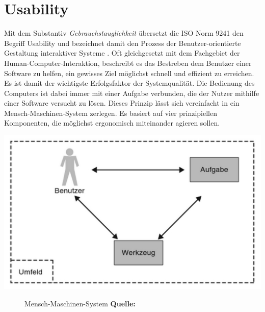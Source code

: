%
%
%
%

\chapter{Usability}

Mit dem Substantiv \textit{Gebrauchstauglichkeit} übersetzt die ISO Norm 9241 den Begriff Usability und bezeichnet damit den Prozess der \glqq Benutzer-orientierte Gestaltung interaktiver Systeme\grqq{} \cite{iso9241}. Oft gleichgesetzt mit dem Fachgebiet der Human-Computer-Interaktion, beschreibt es das Bestreben dem Benutzer einer Software zu helfen, ein gewisses Ziel möglichst schnell und effizient zu erreichen. Es ist damit der wichtigste Erfolgsfaktor der Systemqualität. Die Bedienung des Computers ist dabei immer mit einer Aufgabe verbunden, die der Nutzer mithilfe einer Software versucht zu lösen. Dieses Prinzip lässt sich vereinfacht in ein Mensch-Maschinen-System zerlegen. Es basiert auf vier prinzipiellen Komponenten, die möglichst ergonomisch miteinander agieren sollen.

\vspace{0.6cm}
\includegraphics[scale=0.5]{./images/human-machine-system}
\begin{figure}[htb]
   \centering
   \caption{Mensch-Maschinen-System \textbf{Quelle:} \cite{UsabilityKompakt}}
    \label{mms}
\end{figure}

